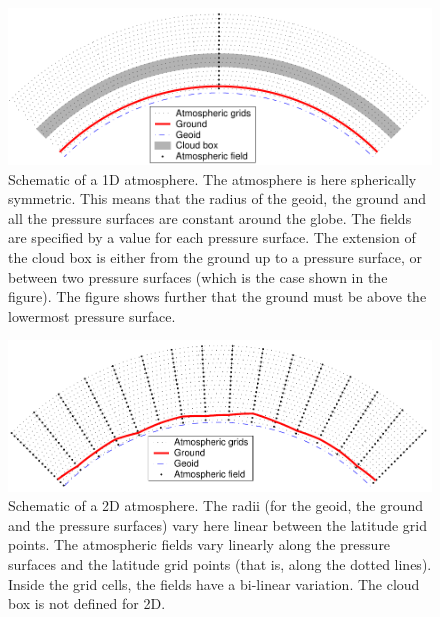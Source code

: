 \begin{figure}[!t]
 \begin{center}
  \includegraphics*[width=0.98\hsize]{Figs/fm_definitions/atm_dim_1d}
  \caption{Schematic of a 1D atmosphere. The atmosphere is 
    here spherically symmetric. This means that the radius of the
    geoid, the ground and all the pressure surfaces are constant
    around the globe. The fields are specified by a value for each
    pressure surface. The extension of the cloud box is either from
    the ground up to a pressure surface, or between two pressure
    surfaces (which is the case shown in the figure). The figure shows
    further that the ground must be above the lowermost pressure
    surface. }
  \label{fig:fm_defs:1d}  
 \end{center}
\end{figure}

\begin{figure}[!t]
 \begin{center}
  \includegraphics*[width=0.98\hsize]{Figs/fm_definitions/atm_dim_2d}
  \caption{Schematic of a 2D atmosphere. The radii (for the geoid, the ground
    and the pressure surfaces) vary here linear between the latitude
    grid points. The atmospheric fields vary linearly along the
    pressure surfaces and the latitude grid points (that is, along the
    dotted lines). Inside the grid cells, the fields have a bi-linear
    variation. The cloud box is not defined for 2D.  }
  \label{fig:fm_defs:2d}
 \end{center}
\end{figure}

